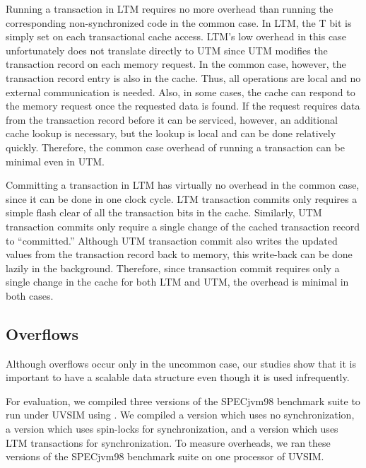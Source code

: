 Running a transaction in LTM requires no more overhead than running
the corresponding non-synchronized code in the common case. In LTM,
the T bit is simply set on each transactional cache access. LTM's low
overhead in this case unfortunately does not translate directly to UTM
since UTM modifies the transaction record on each memory
request. In the common case, however, the transaction record entry is
also in the cache. Thus, all operations are local and no external
communication is needed. Also, in some cases, the cache can respond to
the memory request once the requested data is found.  If the
request requires data from the transaction record before it can be
serviced, however, an additional cache lookup is necessary, but the lookup
is local and can be done relatively quickly.  Therefore, the common case overhead of
running a transaction can be minimal even in UTM\@.

Committing a transaction in LTM has virtually no overhead in the
common case, since it can be done in one clock cycle. LTM transaction
commits only requires a simple flash clear of all the transaction bits
in the cache. Similarly, UTM transaction commits only require a single
change of the cached transaction record to ``committed.''  Although UTM
transaction commit also writes the updated values from the transaction
record back to memory, this write-back can be done lazily in
the background.  Therefore, since transaction commit requires only a
single change in the cache for both LTM and UTM, the overhead is
minimal in both cases.

\subsection{Overflows}

Although overflows occur only in the uncommon case,
our studies show that it is important to have a scalable data
structure even though it is used infrequently.

For evaluation, we compiled three versions of the SPECjvm98 benchmark
suite to run under UVSIM using \flex. We compiled
a  version which uses no synchronization, a 
version which uses spin-locks for synchronization, and a 
version which uses LTM transactions for synchronization. To measure
overheads, we ran these versions of the SPECjvm98 benchmark suite on
one processor of UVSIM\@.

